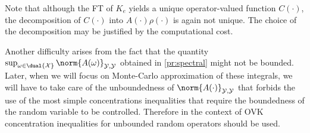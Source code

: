 \begin{remark}
    Note that although the \acl{FT} of $K_e$ yields a unique operator-valued
    function $C(\cdot)$, the decomposition of $C(\cdot)$ into
    $A(\cdot)\rho(\cdot)$ is again not unique. The choice of the decomposition
    may be justified by the computational cost.
\end{remark}

Another difficulty arises from the fact that the quantity
$\sup_{\omega\in\dual{\mathcal{X}}} \norm{A(\omega)}_{\mathcal{Y},\mathcal{Y}}$
obtained in \cref{pr:spectral} might not be bounded. Later, when we will focus
on Monte-Carlo approximation of these integrals, we will have to take care of
the unboundedness of $\norm{A(\cdot)}_{\mathcal{Y},\mathcal{Y}}$ that forbids
the use of the most simple concentrations inequalities that require the
boundedness of the random variable to be controlled. Therefore in the context
of \acl{OVK} concentration inequalities for unbounded random operators should
be used.


